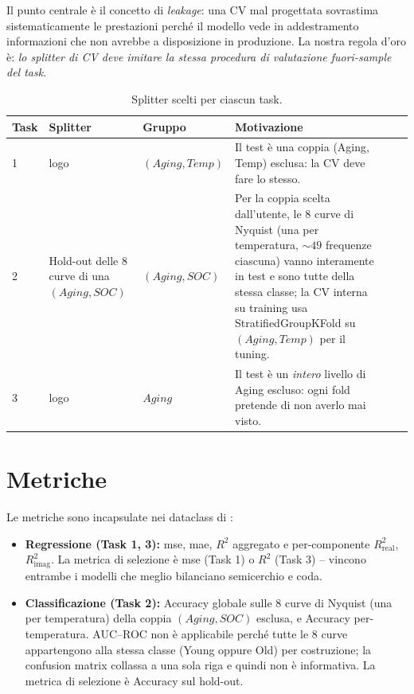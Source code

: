 Il punto centrale è il concetto di \emph{leakage}: una CV mal progettata
sovrastima sistematicamente le prestazioni perché il modello vede in
addestramento informazioni che non avrebbe a disposizione in produzione.
La nostra regola d'oro è: \emph{lo splitter di CV deve imitare la stessa
procedura di valutazione fuori-sample del task}.

\begin{table}[H]
  \centering
  \caption{Splitter scelti per ciascun task.}
  \label{tab:cv-strategy}
  \begin{tabularx}{\linewidth}{l X l X ll}
    \toprule
    \textbf{Task} & \textbf{Splitter} & \textbf{Gruppo} & \textbf{Motivazione} \\
    \midrule
    1 & \acrshort{logo} & $(Aging, Temp)$ & Il test è una coppia (Aging, Temp) esclusa: la CV deve fare lo stesso. \\
    2 & Hold-out delle 8 curve di una $(Aging, SOC)$ & $(Aging, SOC)$ & Per la coppia scelta dall'utente, le 8 curve di Nyquist (una per temperatura, ${\sim}49$ frequenze ciascuna) vanno interamente in test e sono tutte della stessa classe; la CV interna su training usa StratifiedGroupKFold su $(Aging, Temp)$ per il tuning. \\
    3 & \acrshort{logo} & $Aging$ & Il test è un \emph{intero} livello di Aging escluso: ogni fold pretende di non averlo mai visto. \\
    \bottomrule
  \end{tabularx}
\end{table}

\section{Metriche}

Le metriche sono incapsulate nei dataclass di
:

\begin{itemize}
  \item \textbf{Regressione (Task 1, 3):} \acrshort{mse}, \acrshort{mae},
        $R^{2}$ aggregato e per-componente $R_\text{real}^{2}$,
        $R_\text{imag}^{2}$. La metrica di selezione è
        \acrshort{mse} (Task 1) o $R^{2}$ (Task 3) -- vincono entrambe i
        modelli che meglio bilanciano semicerchio e coda.
  \item \textbf{Classificazione (Task 2):} Accuracy globale sulle 8
        curve di Nyquist (una per temperatura) della coppia
        $(Aging, SOC)$ esclusa, e Accuracy per-temperatura. AUC--ROC
        non è applicabile perché tutte le 8 curve appartengono alla
        stessa classe (Young oppure Old) per costruzione; la confusion
        matrix collassa a una sola riga e quindi non è informativa.
        La metrica di selezione è Accuracy sul hold-out.
\end{itemize}

